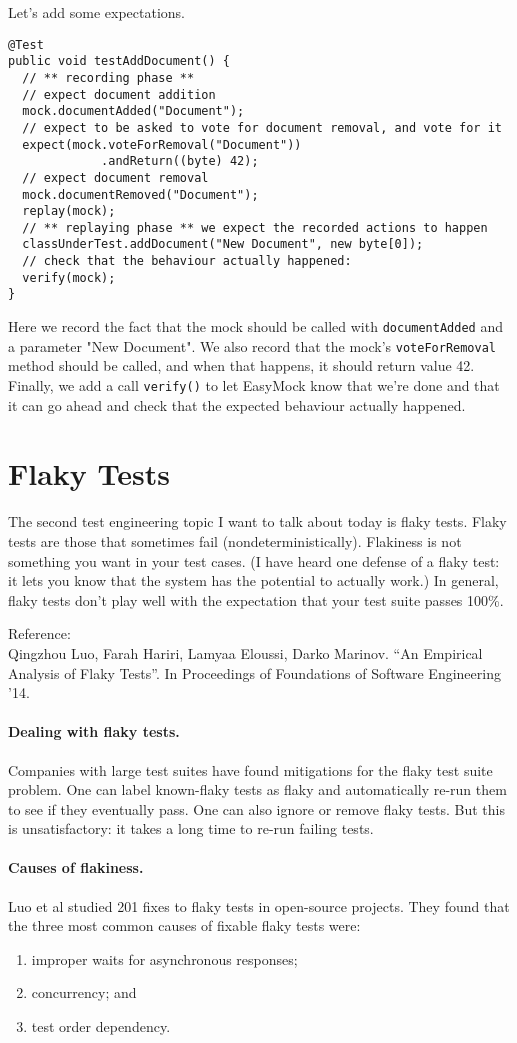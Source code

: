 \documentclass[11pt]{article}
\begin{document}
Let's add some expectations.
\begin{lstlisting}
@Test
public void testAddDocument() {
  // ** recording phase **
  // expect document addition
  mock.documentAdded("Document");
  // expect to be asked to vote for document removal, and vote for it
  expect(mock.voteForRemoval("Document"))
             .andReturn((byte) 42);
  // expect document removal
  mock.documentRemoved("Document");
  replay(mock);
  // ** replaying phase ** we expect the recorded actions to happen
  classUnderTest.addDocument("New Document", new byte[0]);
  // check that the behaviour actually happened:
  verify(mock);
}
\end{lstlisting}
Here we record the fact that the mock should be called with {\tt documentAdded}
and a parameter "New Document". We also record that the mock's 
{\tt voteForRemoval} method should be called, and when that happens, it should return
value 42.
Finally, we add a call {\tt verify()} to let EasyMock
know that we're done and that it can go ahead and check that the expected behaviour actually happened.

\section*{Flaky Tests}
The second test engineering topic I want to talk about today is flaky tests. 
Flaky tests are those that sometimes fail (nondeterministically).
Flakiness is not something you want in your test cases. 
(I have heard one defense of a flaky test: it lets you know that 
the system has the potential to actually work.) 
In general, flaky tests don't play well with the expectation that
your test suite passes 100\%.

Reference:\\
Qingzhou Luo, Farah Hariri, Lamyaa Eloussi, Darko Marinov. ``An Empirical Analysis of Flaky Tests''. In Proceedings of Foundations of Software Engineering '14.

\paragraph{Dealing with flaky tests.} Companies with large test suites have found mitigations
for the flaky test suite problem. One can label known-flaky tests as flaky and automatically
re-run them to see if they eventually pass. One can also ignore or remove flaky tests.
But this is unsatisfactory: it takes a long time to re-run failing tests.

\paragraph{Causes of flakiness.} Luo et al studied 201 fixes to flaky tests in open-source
projects. They found that the three most common causes of fixable flaky tests were:
\begin{enumerate}[noitemsep]
    \item improper waits for asynchronous responses;
    \item concurrency; and
    \item test order dependency.
\end{enumerate}
\end{document}
